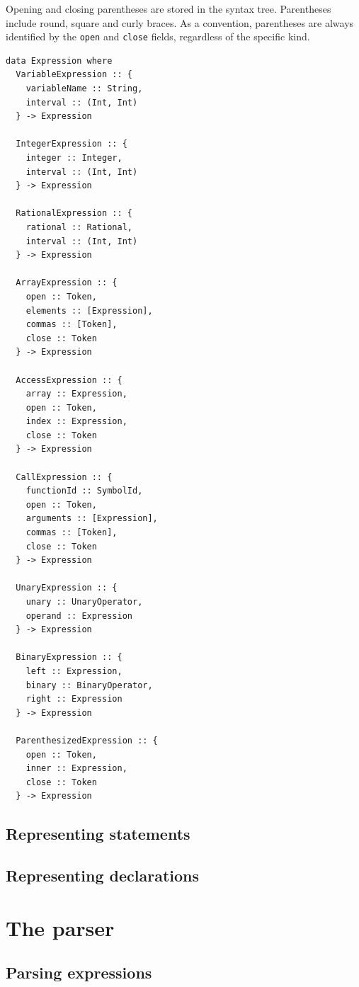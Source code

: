 \documentclass[11pt, american, draft]{PhdThesis}
\begin{document}
  Opening and closing parentheses are stored in the syntax tree. Parentheses include round, square
  and curly braces. As a convention, parentheses are always identified by the \verb$open$ and
  \verb$close$ fields, regardless of the specific kind.

\begin{verbatim}
data Expression where
  VariableExpression :: {
    variableName :: String,
    interval :: (Int, Int)
  } -> Expression

  IntegerExpression :: {
    integer :: Integer,
    interval :: (Int, Int)
  } -> Expression

  RationalExpression :: {
    rational :: Rational,
    interval :: (Int, Int)
  } -> Expression

  ArrayExpression :: {
    open :: Token,
    elements :: [Expression],
    commas :: [Token],
    close :: Token
  } -> Expression

  AccessExpression :: {
    array :: Expression,
    open :: Token,
    index :: Expression,
    close :: Token
  } -> Expression

  CallExpression :: {
    functionId :: SymbolId,
    open :: Token,
    arguments :: [Expression],
    commas :: [Token],
    close :: Token
  } -> Expression

  UnaryExpression :: {
    unary :: UnaryOperator,
    operand :: Expression
  } -> Expression

  BinaryExpression :: {
    left :: Expression,
    binary :: BinaryOperator,
    right :: Expression
  } -> Expression

  ParenthesizedExpression :: {
    open :: Token,
    inner :: Expression,
    close :: Token
  } -> Expression
\end{verbatim}

  \subsection{Representing statements}



  \subsection{Representing declarations}

  \section{The parser}

  \subsection{Parsing expressions}
\end{document}
